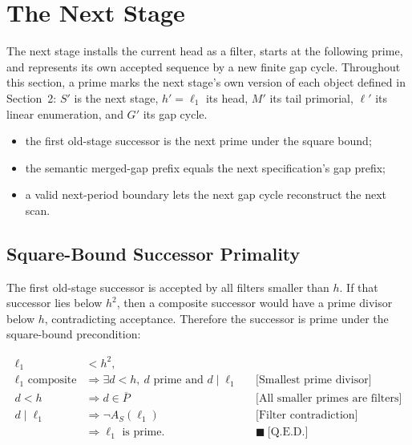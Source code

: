 \section{The Next Stage}
\label{sec:next-stage}

The next stage installs the current head as a filter, starts at the
following prime, and represents its own accepted sequence by a new
finite gap cycle. Throughout this section, a prime marks the next
stage's own version of each object defined in Section~2: $S'$ is the
next stage, $h'=\ell_1$ its head, $M'$ its tail primorial, $\ell'$ its
linear enumeration, and $G'$ its gap cycle.

\begin{itemize}
  \item the first old-stage successor is the next prime under the square
    bound;
  \item the semantic merged-gap prefix equals the next specification's
    gap prefix;
  \item a valid next-period boundary lets the next gap cycle reconstruct
    the next scan.
\end{itemize}

\subsection{Square-Bound Successor Primality}
\label{sec:square-bound-successor-primality}

The first old-stage successor is accepted by all filters smaller than
$h$. If that successor lies below $h^2$, then a composite successor
would have a prime divisor below $h$, contradicting acceptance.
Therefore the successor is prime under the square-bound precondition:

\begin{equation*}
\begin{aligned}
\ell_1&\lt h^2, \\
\ell_1\text{ composite}
&\Longrightarrow
\exists d\lt h,\ d\text{ prime and }d\mid \ell_1
  &&\text{[Smallest prime divisor]} \\
d\lt h
&\Longrightarrow d\in\overline{P}
  &&\text{[All smaller primes are filters]} \\
d\mid\ell_1
&\Longrightarrow \neg A_S(\ell_1)
  &&\text{[Filter contradiction]} \\
&\Longrightarrow \ell_1\text{ is prime}.
  &&\blacksquare\ \text{[Q.E.D.]}
\end{aligned}
\end{equation*}

